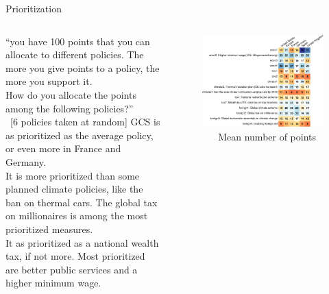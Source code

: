 \documentclass[aspectratio=169,xcolor=dvipsnames, 11pt,mathserif]{beamer}
\begin{document}
\begin{framefont}{\small}
\begin{frame}{Prioritization \hyperlink{donation}{}\label{prioritization}}
    \begin{columns}
        \begin{column}{0.35\textwidth}\vspace{-1cm}
            \bbvs \ip %
			``you have 100 points that you can allocate to different policies. The more you give points to a policy, the more you support it.\\ %
            How do you allocate the points among the following policies?'' \\~[6 policies taken at random]
            \ip GCS is as prioritized as the average policy, or even more in France and Germany. \\ It is more prioritized than some planned climate policies, like the ban on thermal cars.
            \ip The global tax on millionaires is among the most prioritized measures.\\ It as prioritized as a national wealth tax, if not more.
            \ip Most prioritized are better public services and a higher minimum wage.
            \ee        %
        \end{column}
        \begin{column}{0.65\textwidth}\vspace{-.6cm}
            \begin{figure}
                \centering 
                \caption{\quad ~ \quad ~ \quad Mean number of points}
                \vspace{-.3cm}
                \includegraphics[width=\columnwidth]{../figures/country_comparison/points_mean.pdf} 
            \end{figure}
        \end{column}
    \end{columns}
\end{frame}


\end{framefont}
\end{document}

